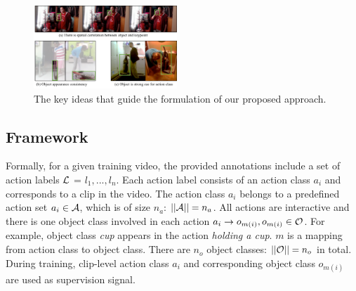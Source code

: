 \begin{figure}
\includegraphics[width=0.48\textwidth]{figures/keyidea.pdf}
\caption{The key ideas that guide the formulation of our proposed approach.}
\label{fig:keyidea}
\end{figure}

\subsection{Framework}

Formally, for a given training video, the provided annotations include a set of action labels ${\mathcal L}$ = {$l_1,...,l_n$}. Each action label consists of an action class $a_i$ and corresponds to a clip in the video. The action class $a_i$ belongs to a predefined action set $a_i \in {\mathcal A}$, which is of size $n_{a}$: $||{\mathcal A}||=n_{a}$. All actions are interactive and there is one object class involved in each action $a_i\rightarrow o_{m(i)}, o_{m(i)}\in {\mathcal O}$. For example, object class \textit{cup} appears in the action \textit{holding a cup}. $m$ is a mapping from action class to object class. There are $n_{o}$ object classes: $||{\mathcal O}||=n_{o}$ in total. During training, clip-level action class $a_i$ and corresponding object class $o_{m(i)}$ are used as supervision signal.

